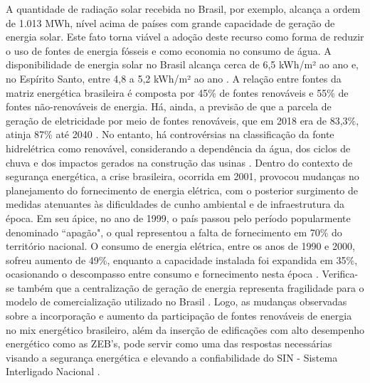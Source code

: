 \begin{onehalfspace}
\noindent A quantidade de radiação solar recebida no Brasil, por exemplo, alcança a ordem de 1.013 MWh, nível acima de países com grande capacidade de geração de energia solar. Este fato torna viável a adoção deste recurso como forma de reduzir o uso de fontes de energia fósseis e como economia no consumo de água. A disponibilidade de energia solar no Brasil alcança cerca de 6,5 kWh/m² ao ano e, no Espírito Santo, entre 4,8 a 5,2 kWh/m² ao ano \cite{AgenciadeRegulacaodeServicosPublicosdoEspiritoSanto-ARSP2019, Didone2014,InternationalEnergyAgency-IEA2018}.\vspace*{0.3cm} \newline
\noindent A relação entre fontes da matriz energética brasileira é composta por 45\% de fontes renováveis e 55\% de fontes não-renováveis de energia. Há, ainda, a previsão de que a parcela de geração de eletricidade por meio de fontes renováveis, que em 2018 era de 83,3\%, atinja 87\% até 2040 \cite{EmpresadePesquisaEnergetica-EPE2017}. No entanto, há controvérsias na classificação da fonte hidrelétrica como renovável, considerando a dependência da água, dos ciclos de chuva e dos impactos gerados na construção das usinas \cite{Leme2012}.\vspace*{0.3cm} \newline
\noindent Dentro do contexto de segurança energética, a crise brasileira, ocorrida em 2001, provocou mudanças no planejamento do fornecimento de energia elétrica, com o posterior surgimento de medidas atenuantes às dificuldades de cunho ambiental e de infraestrutura da época. Em seu ápice, no ano de 1999, o país passou pelo período popularmente denominado “apagão", o qual representou a falta de fornecimento em 70\% do território nacional. O consumo de energia elétrica, entre os anos de 1990 e 2000, sofreu aumento de 49\%, enquanto a capacidade instalada foi expandida em 35\%, ocasionando o descompasso entre consumo e fornecimento nesta época \cite{Conejero2016,Tolmasquim2000}.\vspace*{0.3cm} \newline
\noindent Verifica-se também que a centralização de geração de energia representa fragilidade para o modelo de comercialização utilizado no Brasil \cite{Pinto2017}. Logo, as mudanças observadas sobre a incorporação e aumento da participação de fontes renováveis de energia no mix energético brasileiro, além da inserção de edificações com alto desempenho energético como as ZEB’s, pode servir como uma das respostas necessárias visando a segurança energética e elevando a confiabilidade do SIN - Sistema Interligado Nacional \cite{EmpresadePesquisaEnergetica-EPE2017a}.\vspace*{0.3cm} \newline

\end{onehalfspace}
